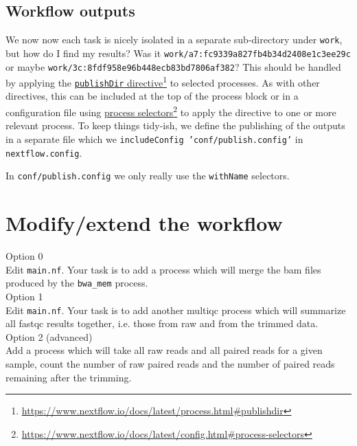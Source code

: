 \subsection{Workflow outputs}

We now now each task is nicely isolated in a separate sub-directory under \texttt{work}, but how do I find my results? Was it \texttt{work/a7:fc9339a827fb4b34d2408e1c3ee29c} or maybe \texttt{work/3c:8fdf958e96b448ecb83bd7806af382}? This should be handled by applying the \href{https://www.nextflow.io/docs/latest/process.html#publishdir}{\texttt{publishDir} directive}\footnote{\url{https://www.nextflow.io/docs/latest/process.html\#publishdir}} to selected processes. As with other directives, this can be included at the top of the process block or in a configuration file using \href{https://www.nextflow.io/docs/latest/config.html#process-selectors}{process selectors}\footnote{\url{https://www.nextflow.io/docs/latest/config.html\#process-selectors}} to apply the directive to one or more relevant process. To keep things tidy-ish, we define the publishing of the outputs in a separate file 
which we \texttt{includeConfig 'conf/publish.config'} in \texttt{nextflow.config}. 

\begin{bonus}
In \texttt{conf/publish.config} we only really use the \texttt{withName} selectors. 

\end{bonus}

\section{Modify/extend the workflow}

\begin{steps}

Option 0\\
Edit \texttt{main.nf}. Your task is to add a process which will merge the bam files produced by the \texttt{bwa\_mem} process.\\ 

Option 1\\
Edit \texttt{main.nf}. Your task is to add another multiqc process which will summarize all fastqc results together, i.e. those from raw and from the trimmed data. \\

Option 2 (advanced) \\
Add a process which will take all raw reads and all paired reads for a given sample, count the number of raw paired reads and the number of paired reads remaining after the trimming.


\end{steps}

